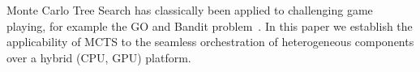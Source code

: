 \documentclass[smallextended]{svjour3}
\begin{document}
%
Monte Carlo Tree Search has classically been applied to challenging game playing, for example the GO and Bandit 
problem~\cite{coulom2007efficient}.
In this paper we establish the applicability of MCTS to the seamless orchestration of heterogeneous components over a hybrid (CPU, GPU) platform.
\end{document}
